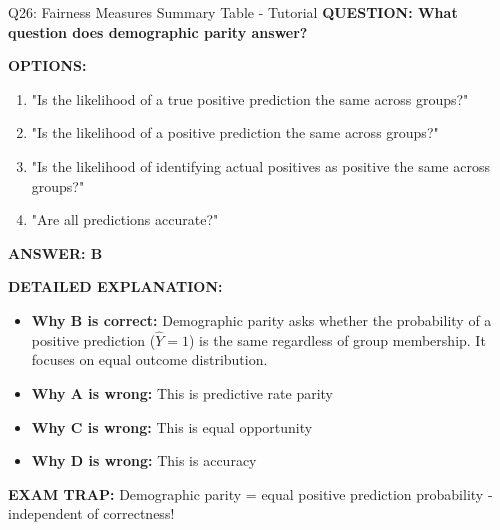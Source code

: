 \documentclass[8pt]{beamer}
\begin{document}
	\begin{frame}{Q26: Fairness Measures Summary Table - Tutorial}
		\fontsize{6.5}{7.5}\selectfont
		\textbf{QUESTION: What question does demographic parity answer?}
		
		\vspace{0.1cm}
		\textbf{OPTIONS:}
		\begin{enumerate}
			\item "Is the likelihood of a true positive prediction the same across groups?"
			\item "Is the likelihood of a positive prediction the same across groups?"
			\item "Is the likelihood of identifying actual positives as positive the same across groups?"
			\item "Are all predictions accurate?"
		\end{enumerate}
		
		\vspace{0.1cm}
		\textcolor{myblue}{\textbf{ANSWER: B}}
		
		\vspace{0.1cm}
		\textbf{DETAILED EXPLANATION:}
		\begin{itemize}
			\item \textbf{Why B is correct:} Demographic parity asks whether the probability of a positive prediction ($\hat{Y}=1$) is the same regardless of group membership. It focuses on equal outcome distribution.
			\item \textbf{Why A is wrong:} This is predictive rate parity
			\item \textbf{Why C is wrong:} This is equal opportunity
			\item \textbf{Why D is wrong:} This is accuracy
		\end{itemize}
		
		\textcolor{myred}{\textbf{EXAM TRAP:}} Demographic parity = \textcolor{myblue}{equal positive prediction probability} - independent of correctness!
	\end{frame}
	
\end{document}
